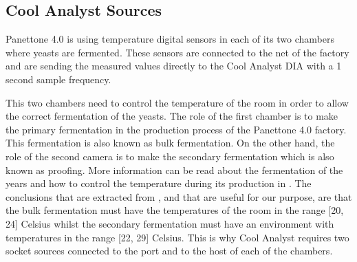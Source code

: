\subsection{Cool Analyst Sources}

Panettone 4.0 is using temperature digital sensors in each of its two chambers where yeasts are fermented. These sensors are connected to the net of the factory and are sending the measured values directly to the Cool Analyst DIA with a 1 second sample frequency.

This two chambers need to control the temperature of the room in order to allow the correct fermentation of the yeasts. The role of the first chamber is to make the primary fermentation in the production process of the Panettone 4.0 factory. This fermentation is also known as bulk fermentation. On the other hand, the role of the second camera is to make the secondary fermentation which is also known as proofing. More information can be read about the fermentation of the years and how to control the temperature during its production in \cite{yeastfermentation}. The conclusions that are extracted from \cite{yeastfermentation}, and that are useful for our purpose, are that the bulk fermentation must have the temperatures of the room in the range [20, 24] Celsius whilst the secondary fermentation must have an environment with temperatures in the range [22, 29] Celsius. This is why Cool Analyst requires two socket sources connected to the port and to the host of each of the chambers.

